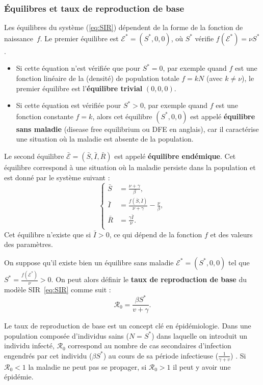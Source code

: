 	
\subsubsection{Équilibres et taux de reproduction de base}
\label{sec:R0}
	Les équilibres du système (\ref{eq:SIR}) dépendent de la forme de la fonction de naissance~$f$. Le premier équilibre est $\mathcal{E}^*=(S^*,0,0)$, où $S^*$ vérifie $f(\mathcal{E}^*) = \nu S^*$.
\begin{itemize}
\item Si cette équation n'est vérifiée que pour $S^*=0$, par exemple quand $f$ est une fonction linéaire de la (densité) de population totale $f=kN$ (avec $k\neq\nu$), le premier équilibre est l'\textbf{équilibre trivial} $(0,0,0)$.
\item Si cette équation est vérifiée pour $S^*>0$, par exemple quand $f$ est une fonction constante $f=k$, alors cet équilibre $(S^*,0,0)$ est appelé \textbf{équilibre sans maladie} (\og disease free equilibrium \fg{} ou DFE en anglais), car il caractérise une situation où la maladie est absente de la population.
\end{itemize}
	
	Le second équilibre  $\bar{\mathcal{E}}=(\bar{S},\bar{I},\bar{R})$ est  appelé \textbf{équilibre  endémique}. Cet équilibre correspond à une situation où la maladie persiste dans la population et est donné par le système suivant :  
	\begin{equation}
	\left\{
		\begin{aligned}
		\bar{S} &= \frac{\nu+\gamma}{\beta}, \\
		\bar{I} &= \frac{f(\bar{S},\bar{I})}{\nu+\gamma}-\frac{\nu}{\beta},  \\
		\bar{R} &= \frac{\gamma\bar{I}}{\nu}. \\
		\end{aligned}
		\right.
	\label{sys1}
	\end{equation}
Cet équilibre n'existe que si $\bar{I}>0$, ce qui dépend de la fonction $f$ et des valeurs des paramètres.
	
	On suppose qu'il existe bien un équilibre sans maladie $\mathcal{E}^*=(S^*,0,0)$ tel que $S^*=\frac{f(\mathcal{E}^*)}{\nu}>0$. On peut alors définir le \textbf{taux de reproduction de base} du modèle SIR~\eqref{eq:SIR} comme suit :
	\begin{equation}
	  \mathscr{R}_0=\frac{\beta S^*}{v+\gamma}.
	  \label{R0}
	\end{equation}
	
	Le taux de reproduction de base est un concept clé en épidémiologie. Dans une population composée d’individus sains ($N=S^*$) dans laquelle on introduit un individu infecté, $\mathscr{R}_0$ correspond au nombre de cas secondaires d'infection engendrés par cet individu ($\beta S^*$) au cours de sa période infectieuse ($\frac{1}{\gamma + v}$) \citep{Dieckmann2000,vandenDriessche2002}. Si  $\mathscr{R}_0<1$ la maladie ne peut pas se propager, si $\mathscr{R}_0>1$ il peut y avoir une épidémie.
	

